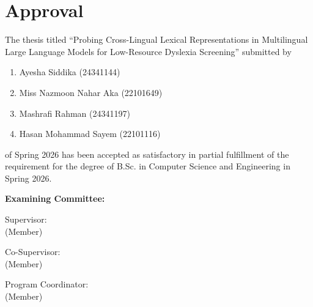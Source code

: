 \section*{Approval}

The thesis titled ``Probing Cross-Lingual Lexical Representations in Multilingual Large Language Models for Low-Resource Dyslexia Screening'' submitted by
\begin{enumerate}
  \item Ayesha Siddika (24341144)
  \item Miss Nazmoon Nahar Aka (22101649)
  \item Mashrafi Rahman (24341197)
  \item Hasan Mohammad Sayem (22101116)
\end{enumerate}

of Spring 2026 has been accepted as satisfactory in partial fulfillment of the requirement for the degree of B.Sc. in Computer Science and Engineering in Spring 2026.

\vspace{0.5cm}
\textbf{Examining Committee:}

\vspace{1cm}

Supervisor:\\
(Member)
\begin{center}
    \hspace{7cm}  \hspace{1cm}
\end{center}

Co-Supervisor:\\
(Member)
\begin{center}
    \hspace{7cm}  \hspace{1cm}
\end{center}

Program Coordinator:\\
(Member)
\begin{center}
    \hspace{7cm}  \hspace{1cm}
\end{center}

